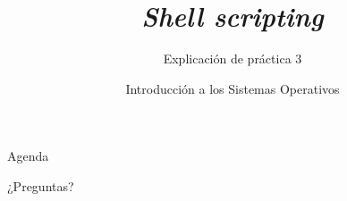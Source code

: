


\title{\textit{Shell scripting}}
\author{Introducción a los Sistemas Operativos}
\subtitle{Explicación de práctica 3}



\begin{frame}
  \titlepage
\end{frame}

\begin{frame}{Agenda}
  \tableofcontents
\end{frame}



\begin{frame}{}
  \begin{center}
    \vfill
    \huge ¿Preguntas?
    \vfill
  \end{center}
\end{frame}


